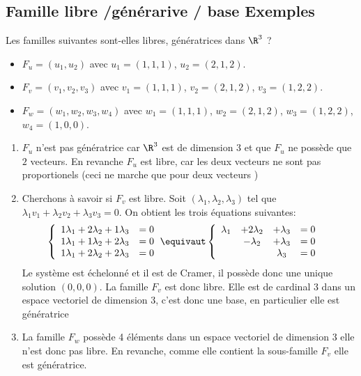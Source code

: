 \subsection{Famille libre /générarive / base Exemples}

\begin{exercice}
Les familles suivantes sont-elles libres, génératrices dans $\R^3$ ?
\begin{itemize}
\item $F_u=(u_1,u_2) $ avec $u_1 = (1,1,1) $, $u_2=(2,1,2)$.
\item $F_v=(v_1,v_2, v_3) $ avec $v_1 = (1,1,1) $, $v_2=(2,1,2)$, $v_3=(1,2,2)$. 
\item $F_w=(w_1,w_2, w_3,w_4) $ avec $w_1 = (1,1,1) $, $w_2=(2,1,2)$, $w_3=(1,2,2)$, $w_4=(1,0,0)$. 
\end{itemize}
\end{exercice}
\vsec\vsec\vsec
\begin{correction}
\begin{enumerate}
\item $F_u$ n'est pas génératrice car $\R^3$ est de dimension $3$ et que $F_u$ ne possède que $2$ vecteurs. En revanche $F_u$ est libre, car les deux vecteurs ne sont pas proportionels (ceci ne marche que pour deux vecteurs )
\item Cherchons à savoir si $F_v$ est libre. 
Soit $(\lambda_1, \lambda_2, \lambda_3) $ tel que $\lambda_1 v_1 +\lambda_2 v_2 +\lambda_3 v_3 =0$. 
On obtient les trois équations suivantes:
\begin{align*}
\left\{ 
\begin{array}{cc}
1\lambda_1 +2\lambda_2 +1\lambda_3 &=0\\
1\lambda_1 +1\lambda_2 +2\lambda_3 &=0\\
1\lambda_1 +2\lambda_2 +2\lambda_3 &=0
\end{array}\right. & \equivaut 
\left\{ 
\begin{array}{cccc}
\lambda_1 &+2\lambda_2 &+\lambda_3 &=0\\
 &-\lambda_2 &+\lambda_3 &=0\\
&&\lambda_3 &=0
\end{array}\right. 
\end{align*}
Le système est échelonné et il est de Cramer, il possède donc une unique solution $(0,0,0)$. La famille $F_v$ est donc libre. 
Elle est de cardinal 3 dans un espace vectoriel de dimension 3, c'est donc une base, en particulier elle est génératrice 
\item La famille $F_w$ possède 4 éléments dans un espace vectoriel de dimension $3$ elle n'est donc pas libre. En revanche, comme elle contient la sous-famille $F_v$ elle est génératrice. 

\end{enumerate}
\end{correction}






